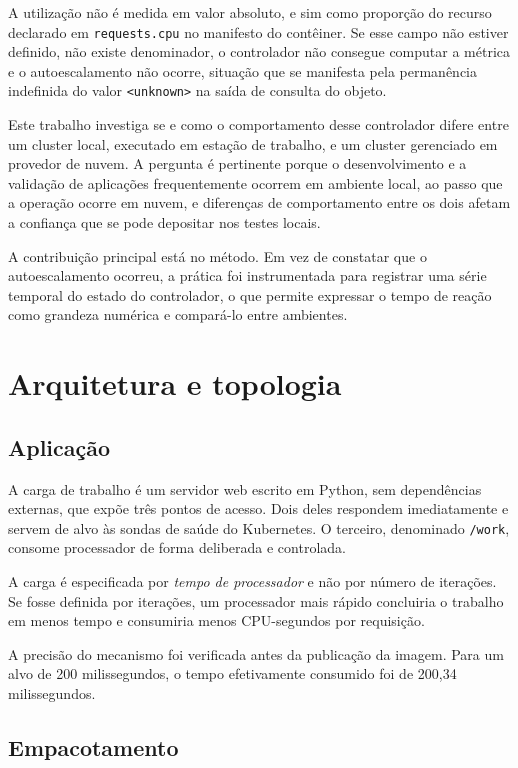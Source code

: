 \documentclass[12pt]{article}
\begin{document}
A utilização não é medida em valor absoluto, e sim como proporção do recurso
declarado em \texttt{requests.cpu} no manifesto do contêiner. Se esse campo não
estiver definido, não existe denominador, o controlador não consegue computar a
métrica e o autoescalamento não ocorre, situação que se manifesta pela
permanência indefinida do valor \texttt{<unknown>} na saída de consulta do
objeto.

Este trabalho investiga se e como o comportamento desse controlador difere
entre um cluster local, executado em estação de trabalho, e um cluster
gerenciado em provedor de nuvem. A pergunta é pertinente porque o
desenvolvimento e a validação de aplicações frequentemente ocorrem em ambiente
local, ao passo que a operação ocorre em nuvem, e diferenças de comportamento
entre os dois afetam a confiança que se pode depositar nos testes locais.

A contribuição principal está no método. Em vez de constatar que o
autoescalamento ocorreu, a prática foi instrumentada para registrar uma série
temporal do estado do controlador, o que permite expressar o tempo de reação
como grandeza numérica e compará-lo entre ambientes.

\section{Arquitetura e topologia}

\subsection{Aplicação}

A carga de trabalho é um servidor web escrito em Python, sem dependências
externas, que expõe três pontos de acesso. Dois deles respondem imediatamente e
servem de alvo às sondas de saúde do Kubernetes. O terceiro, denominado
\texttt{/work}, consome processador de forma deliberada e controlada.

A carga é especificada por \emph{tempo de processador} e não por número de iterações. Se
fosse definida por iterações, um processador mais rápido concluiria o trabalho
em menos tempo e consumiria menos CPU-segundos por requisição. 

A precisão do mecanismo foi verificada antes da publicação da imagem. Para um
alvo de 200 milissegundos, o tempo efetivamente consumido foi de 200,34
milissegundos.

\subsection{Empacotamento}
\end{document}
